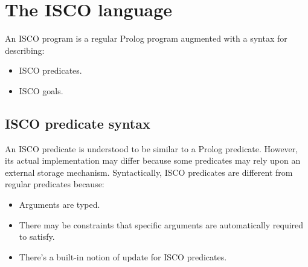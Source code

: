 
%  
%  
%  
%  

\section{The ISCO language}
\label{sec:isco-language}

An ISCO program is a regular Prolog program augmented with a syntax for
describing:
\begin{itemize}
\item ISCO predicates.
\item ISCO goals.
\end{itemize}

\subsection{ISCO predicate syntax}
\label{sec:pred-syntax}

An ISCO predicate is understood to be similar to a Prolog predicate.  However,
its actual implementation may differ because some predicates may rely upon an
external storage mechanism.  Syntactically, ISCO predicates are different from
regular predicates because:
\begin{itemize}
\item Arguments are typed.
\item There may be constraints that specific arguments are automatically
  required to satisfy.
\item There's a built-in notion of update for ISCO predicates.
\end{itemize}

